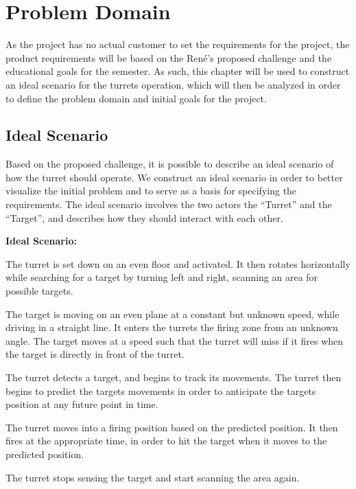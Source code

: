 \chapter{Problem Domain}\label{ProblemDomain}
As the project has no actual customer to set the requirements for the project,
the product requirements will be based on the Ren\'e's proposed challenge and
the educational goals for the semester.\nl 
As such, this chapter will be used to construct an ideal scenario for the
turrets operation, which will then be analyzed in order to define the problem
domain and initial goals for the project.

\section{Ideal Scenario}
Based on the proposed challenge, it is possible to describe an ideal scenario
of how the turret should operate. We construct an ideal scenario in order to better
visualize the initial problem and to serve as a basis for specifying the
requirements. The ideal scenario involves the two actors the ``Turret'' and the
``Target'', and describes how they should interact with each other.

\begin{center}
\colorbox{diff}{
\begin{minipage}{0.8\linewidth}
\textbf{Ideal Scenario:}

The turret is set down on an even floor and activated. It then rotates
horizontally while searching for a target by turning left and right, scanning an
area for possible targets.\nl

The target is moving on an even plane at a constant but unknown speed, while
driving in a straight line. It enters the turrets the firing zone from an
unknown angle. The target moves at a speed such that the turret will miss if it
fires when the target is directly in front of the turret.\nl

The turret detects a target, and begins to track its movements. The turret then
begins to predict the targets movements in order to anticipate the targets
position at any future point in time.\nl

The turret moves into a firing position based on the predicted position. It then
fires at the appropriate time, in order to hit the target when it moves to the
predicted position.\nl

The turret stops sensing the target and start scanning the area again.
\end{minipage}
}
\end{center}

